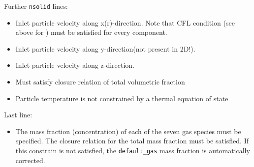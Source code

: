 Further {\tt nsolid} lines:
\begin{itemize}
\item
{}
{Inlet particle velocity along x(r)-direction.
Note that CFL condition (see above for ) 
must be satisfied for every component.}

\item
{}
{Inlet particle velocity along y-direction(not present in 2D!).}

\item
{}
{Inlet particle velocity along z-direction.}

\item
{}
{Must satisfy closure relation of total volumetric fraction}

\item
{}
{Particle temperature is not constrained by a thermal equation of state}

\end{itemize}

Last line:

\begin{itemize}

\item
{}
{The mass fraction (concentration) of each of the seven gas species must be
specified. The closure relation for the total mass fraction must be satisfied.
If this constrain is not satisfied, the {\tt default\_gas} mass fraction is
automatically corrected.}

\end{itemize}

